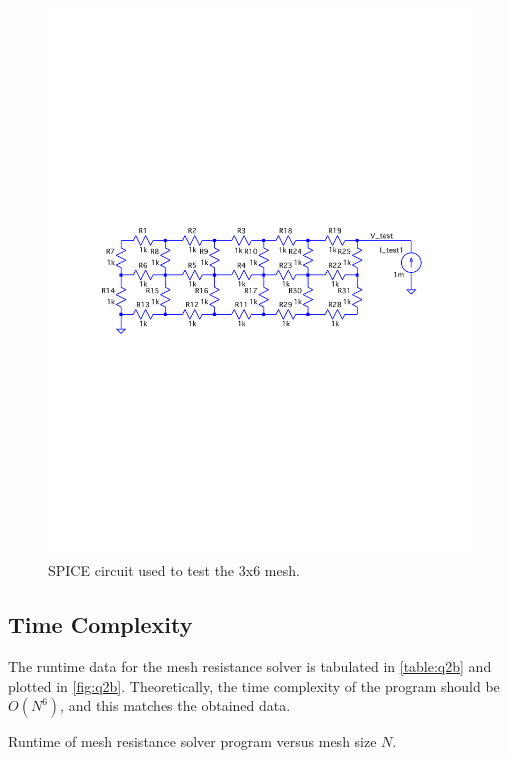 \documentclass[a4paper,titlepage]{article}
\begin{document}
	\begin{figure}[!htb]
		\centering
		\includegraphics[width=\columnwidth]{plots/q2a_mesh_3.pdf}
		\caption
		{SPICE circuit used to test the 3x6 mesh.}
		\label{fig:q2a_mesh_3}
	\end{figure}
	
	\subsection{Time Complexity}
	
	The runtime data for the mesh resistance solver is tabulated in \autoref{table:q2b} and plotted in \autoref{fig:q2b}. Theoretically, the time complexity of the program should be $O(N^6)$, and this matches the obtained data.
	
	\begin{table}[!htb]
		\centering
		\caption{Runtime of mesh resistance solver program versus mesh size $N$.}
		\label{table:q2b}
	\end{table}
\end{document}
